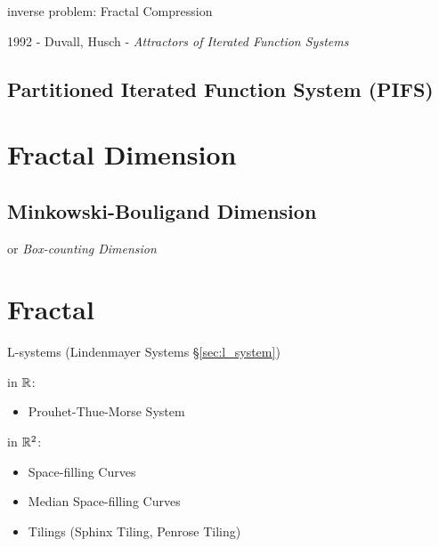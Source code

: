 inverse problem: Fractal Compression

1992 - Duvall, Husch - \emph{Attractors of Iterated Function Systems}



\subsection{Partitioned Iterated Function System (PIFS)}\label{sec:pifs}



\section{Fractal Dimension}\label{sec:fractal_dimension}

\subsection{Minkowski-Bouligand Dimension}
\label{sec:minkowski_bouligand}

or \emph{Box-counting Dimension}



\section{Fractal}\label{sec:fractal}

\asterism

L-systems (Lindenmayer Systems \S\ref{sec:l_system})


in $\mathbb{R}$:
\begin{itemize}
  \item Prouhet-Thue-Morse System
\end{itemize}

in $\mathbb{R}^2$:
\begin{itemize}
  \item Space-filling Curves
  \item Median Space-filling Curves
  \item Tilings (Sphinx Tiling, Penrose Tiling)
\end{itemize}



